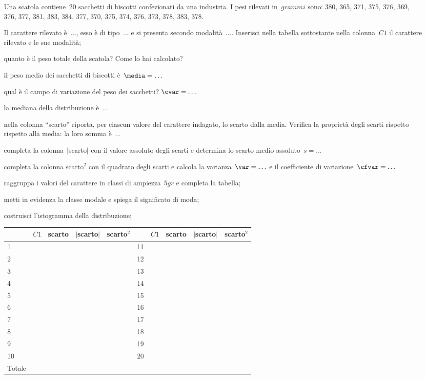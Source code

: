 \begin{esercizio}
\label{ese:A.46}
Una scatola contiene~20 sacchetti di biscotti confezionati da una industria. I pesi rilevati in~$\unit{grammi}$ sono:
380, 365, 371, 375, 376, 369, 376, 377, 381, 383, 384, 377, 370, 375, 374, 376, 373, 378, 383, 378.
\begin{enumeratea}
 \item Il carattere rilevato è~$\ldots$, esso è di tipo~$\ldots$ e si presenta secondo modalità~$\ldots$.
 Inserisci nella tabella sottostante nella colonna~$C1$ il carattere rilevato e le sue modalità;
 \item quanto è il peso totale della scatola? Come lo hai calcolato?
 \item il peso medio dei sacchetti di biscotti è~$\media = \ldots$
 \item qual è il campo di variazione del peso dei sacchetti? $\cvar = \ldots$
 \item la mediana della distribuzione è~$\ldots$
 \item nella colonna ``scarto'' riporta, per ciascun valore del carattere indagato, lo scarto dalla media.
 Verifica la proprietà degli scarti rispetto rispetto alla media: la loro somma è~$\ldots$
 \item completa la colonna~$\vert$scarto$\vert$ con il valore assoluto degli scarti e determina lo scarto medio assoluto~$s = \dots$
 \item completa la colonna scarto$^2$ con il quadrato degli scarti e calcola la varianza~$\var = \ldots$ e
 il coefficiente di variazione~$\cfvar = \ldots$
 \item raggruppa i valori del carattere in classi di ampiezza~$5 \unit{gr}$ e completa la tabella;
 \item metti in evidenza la classe modale e spiega il significato di moda;
 \item costruisci l'istogramma della distribuzione;

\begin{center}
\begin{tabular}{*{2}{lcccc}}
\toprule
 & $C1$ & scarto &$\vert$scarto$\vert$ &scarto$^2$& & $C1$ & scarto &$\vert$scarto$\vert$ &scarto$^2$\\
\midrule
1 & & & & &11 & & & &\\
2 & & & & &12 & & & &\\
3 & & & & &13 & & & &\\
4 & & & & &14 & & & &\\
5 & & & & &15 & & & &\\
6 & & & & &16 & & & &\\
7 & & & & &17 & & & &\\
8 & & & & &18 & & & &\\
9 & & & & &19 & & & &\\
10 & & & & &20 & & & &\\
\midrule
Totale & & & &&&&\\
\bottomrule
\end{tabular}
\end{center}


\end{enumeratea}
\end{esercizio}
